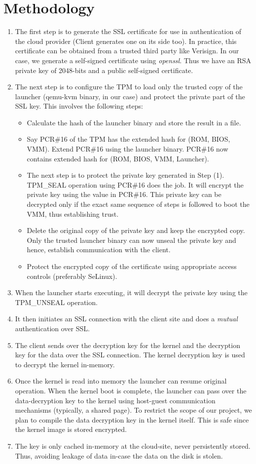 \documentclass[11pt,pdftex]{article}
\begin{document}
\section{Methodology}
\begin{enumerate}
\item The first step is to generate the SSL certificate for use in authentication of the cloud provider (Client generates one on its side too). In practice, this certificate can be obtained from a trusted third party like Verisign. In our case, we generate a self-signed certificate using {\em openssl}. Thus we have an RSA private key of 2048-bits and a public self-signed certificate. 
\item The next step is to configure the TPM to load only the trusted copy of the launcher (qemu-kvm binary, in our case) and protect the private part of the SSL key. This involves the following steps:
\begin{itemize}
\item Calculate the hash of the launcher binary and store the result in a file. 
\item Say PCR\#16 of the TPM has the extended hash for (ROM, BIOS, VMM). Extend PCR\#16 using the launcher binary. PCR\#16 now contains extended hash for (ROM, BIOS, VMM, Launcher). 
\item The next step is to protect the private key generated in Step (1). TPM\_SEAL operation using PCR\#16 does the job. It will encrypt the private key using the value in PCR\#16. This private key can be decrypted only if the exact same sequence of steps is followed to boot the VMM, thus establishing trust.
\item Delete the original copy of the private key and keep the encrypted copy. Only the trusted launcher binary can now unseal the private key and hence, establish communication with the client. 
\item Protect the encrypted copy of the certificate using appropriate access controls (preferably SeLinux).
\end{itemize}
\item When the launcher starts executing, it will decrypt the private key using the TPM\_UNSEAL operation. 
\item It then initiates an SSL connection with the client site and does a {\em mutual} authentication over SSL.
\item The client sends over the decryption key for the kernel and the decryption key for the data over the SSL connection. The kernel decryption key is used to decrypt the kernel in-memory.
\item Once the kernel is read into memory the launcher can resume original operation. When the kernel boot is complete, the launcher can pass over the data-decryption key to the kernel using host-guest communication mechanisms (typically, a shared page). To restrict the scope of our project, we plan to compile the data decryption key in the kernel itself. This is safe since the kernel image is stored encrypted.  
\item The key is only cached in-memory at the cloud-site, never persistently stored. Thus, avoiding leakage of data in-case the data on the disk is stolen.
\end{enumerate}
\end{document}
